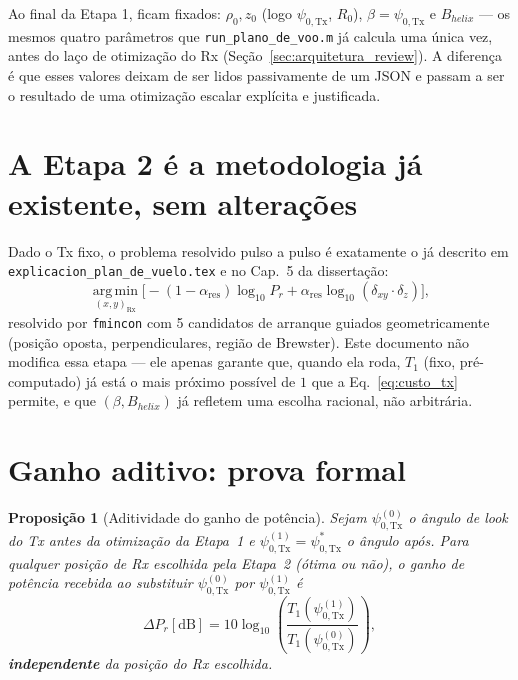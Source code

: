 \documentclass[12pt,a4paper,oneside]{book}
\newtheorem{proposicao}{Proposição}[chapter]
\theoremstyle{definition}
\theoremstyle{remark}
\newcommand{\Prcv}{P_r}
\newcommand{\dxy}{\delta_{xy}}
\newcommand{\dz}{\delta_z}
\newcommand{\psiT}{\psi_{0,\mathrm{Tx}}}
\begin{document}
Ao final da Etapa 1, ficam fixados: $\rho_0,z_0$ (logo $\psiT$, $R_0$),
$\beta=\psiT$ e $B_{helix}$ — os mesmos quatro parâmetros que
\texttt{run\_plano\_de\_voo.m} já calcula uma única vez, antes do laço de
otimização do Rx (Seção~\ref{sec:arquitetura_review}). A diferença é que
esses valores deixam de ser lidos passivamente de um JSON e passam a ser o
resultado de uma otimização escalar explícita e justificada.

\section{A Etapa 2 é a metodologia já existente, sem alterações}

Dado o Tx fixo, o problema resolvido pulso a pulso é exatamente o já
descrito em \texttt{explicacion\_plan\_de\_vuelo.tex} e no Cap.~5 da
dissertação:
\begin{equation}
  \operatorname*{arg\,min}_{(x,y)_{\mathrm{Rx}}}
  \Big[-(1-\alpha_{\mathrm{res}})\log_{10}\Prcv + \alpha_{\mathrm{res}}\log_{10}(\dxy\cdot\dz)\Big],
  \label{eq:etapa2}
\end{equation}
resolvido por \texttt{fmincon} com 5 candidatos de arranque guiados
geometricamente (posição oposta, perpendiculares, região de Brewster).
Este documento não modifica essa etapa — ele apenas garante que, quando
ela roda, $T_1$ (fixo, pré-computado) já está o mais próximo possível de
$1$ que a Eq.~\eqref{eq:custo_tx} permite, e que $(\beta,B_{helix})$ já
refletem uma escolha racional, não arbitrária.

\section{Ganho aditivo: prova formal}

\begin{proposicao}[Aditividade do ganho de potência]
\label{prop:aditividade}
Sejam $\psiT^{(0)}$ o ângulo de \textit{look} do Tx antes da otimização
da Etapa~1 e $\psiT^{(1)}=\psiT^*$ o ângulo após. Para \emph{qualquer}
posição de Rx escolhida pela Etapa~2 (ótima ou não), o ganho de potência
recebida ao substituir $\psiT^{(0)}$ por $\psiT^{(1)}$ é
\begin{equation}
  \Delta \Prcv[\mathrm{dB}] = 10\log_{10}\!\left(\frac{T_1(\psiT^{(1)})}{T_1(\psiT^{(0)})}\right),
  \label{eq:ganho_aditivo}
\end{equation}
\textbf{independente} da posição do Rx escolhida.
\end{proposicao}
\end{document}
